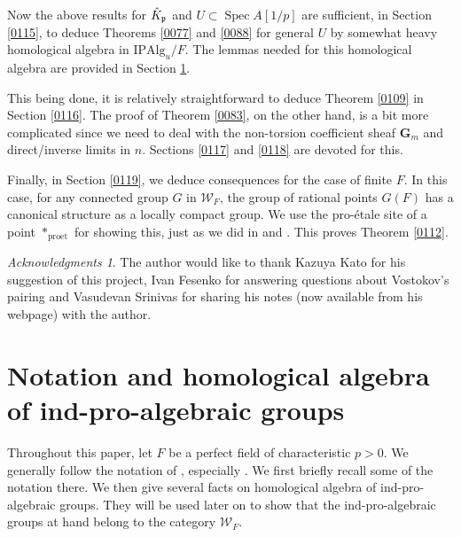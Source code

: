 \documentclass{amsart}
\theoremstyle{remark}
\newtheorem*{Ack}{Acknowledgments}
\numberwithin{equation}{section}
\newcommand{\et}{\mathrm{et}}
\newcommand{\Gm}{\mathbf{G}_{m}}
\newcommand{\pro}{\mathrm{pro}}
\newcommand{\Alg}{\mathrm{Alg}}
\newcommand{\Ind}{\mathrm{I}}
\newcommand{\Pro}{\mathrm{P}}
\newcommand{\ideal}[1]{\mathfrak{#1}}
\DeclareMathOperator{\Spec}{Spec}
\begin{document}
Now the above results for $\Hat{K}_{\ideal{p}}$ and $U \subset \Spec A[1 / p]$
are sufficient, in Section \ref{0115}, to deduce Theorems \ref{0077} and \ref{0088} for general $U$
by somewhat heavy homological algebra in $\Ind \Pro \Alg_{u} / F$.
The lemmas needed for this homological algebra are provided in Section \ref{0114}.

This being done, it is relatively straightforward
to deduce Theorem \ref{0109} in Section \ref{0116}.
The proof of Theorem \ref{0083}, on the other hand, is a bit more complicated
since we need to deal with the non-torsion coefficient sheaf $\Gm$
and direct/inverse limits in $n$.
Sections \ref{0117} and \ref{0118} are devoted for this.

Finally, in Section \ref{0119},
we deduce consequences for the case of finite $F$.
In this case, for any connected group $G$ in $\mathcal{W}_{F}$,
the group of rational points $G(F)$ has a canonical structure
as a locally compact group.
We use the pro-\'etale site of a point $\ast_{\pro\et}$ for showing this,
just as we did in \cite[Section 10]{Suz20} and \cite[Section 4.2]{SuzCurve}.
This proves Theorem \ref{0112}.

\begin{Ack}
	The author would like to thank Kazuya Kato for his suggestion of this project,
	Ivan Fesenko for answering questions about Vostokov's pairing
	and Vasudevan Srinivas for sharing his notes \cite{Sri85}
	(now available from his webpage) with the author.
\end{Ack}


\section{Notation and homological algebra of ind-pro-algebraic groups}
\label{0114}

Throughout this paper, let $F$ be a perfect field of characteristic $p > 0$.
We generally follow the notation of \cite{Suz24},
especially \cite[Section 2]{Suz24}.
We first briefly recall some of the notation there.
We then give several facts on homological algebra of ind-pro-algebraic groups.
They will be used later on to show that
the ind-pro-algebraic groups at hand belong to the category $\mathcal{W}_{F}$.
\end{document}
